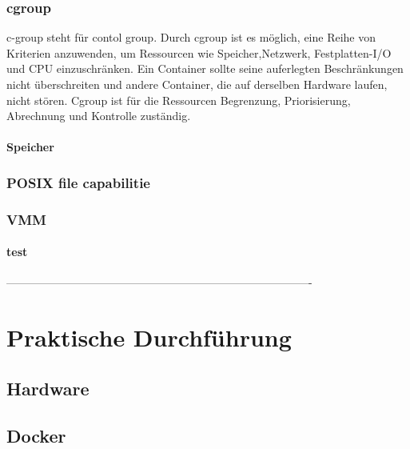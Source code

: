 \documentclass[12pt,a4paper,bibliography=totocnumbered,listof=totocnumbered]{scrartcl}
\begin{document}
\subsubsection{cgroup}
\glqq c-group\grqq{} steht für \glqq contol group\grqq{}. Durch cgroup ist es möglich, eine Reihe von Kriterien anzuwenden, um Ressourcen wie Speicher,Netzwerk, Festplatten-I/O und CPU einzuschränken. Ein Container sollte seine auferlegten Beschränkungen nicht überschreiten und andere Container, die auf derselben Hardware laufen, nicht stören. Cgroup ist für die Ressourcen Begrenzung, Priorisierung, Abrechnung und Kontrolle zuständig.\cite{Heo2015ControlV2}



\paragraph{Speicher}



\subsubsection{POSIX file capabilitie}

\subsubsection{VMM}

\paragraph{test}

\pagebreak

 ----------------------------------------------------------------------------------
\section{Praktische Durchführung}
\subsection{Hardware}
\subsection{Docker}
\end{document}
